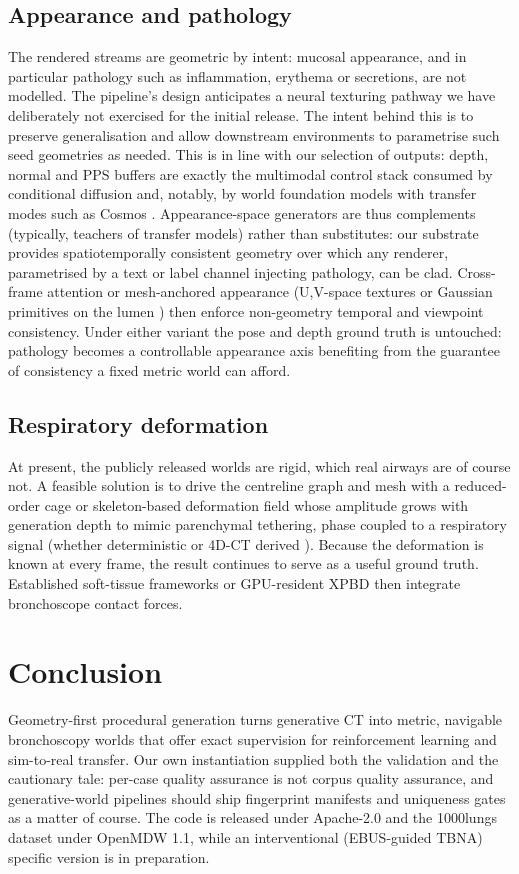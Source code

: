 \documentclass[conference]{IEEEtran}
\begin{document}
\subsection{Appearance and pathology}
\label{sec:appearance}
The rendered streams are geometric by intent: mucosal appearance, and in particular pathology such as inflammation, erythema or secretions, are not modelled. The pipeline's design anticipates a neural texturing pathway we have deliberately not exercised for the initial release. The intent behind this is to preserve generalisation and allow downstream environments to parametrise such seed geometries as needed. This is in line with our selection of outputs: depth, normal and PPS buffers are exactly the multimodal control stack consumed by conditional diffusion \cite{zhang2023controlnet} and, notably, by world foundation models with transfer modes such as Cosmos \cite{nvidia2025cosmos}. Appearance-space generators are thus complements (typically, teachers of transfer models) rather than substitutes: our substrate provides spatiotemporally consistent geometry over which any renderer, parametrised by a text or label channel injecting pathology, can be clad. Cross-frame attention or mesh-anchored appearance (U,V-space textures or Gaussian primitives on the lumen \cite{kerbl20233dgs}) then enforce non-geometry temporal and viewpoint consistency. Under either variant the pose and depth ground truth is untouched: pathology becomes a controllable appearance axis benefiting from the guarantee of consistency a fixed metric world can afford.

\subsection{Respiratory deformation}
At present, the publicly released worlds are rigid, which real airways are of course not. A feasible solution is to drive the centreline graph and mesh with a reduced-order cage or skeleton-based deformation field whose amplitude grows with generation depth to mimic parenchymal tethering, phase coupled to a respiratory signal (whether deterministic or 4D-CT derived \cite{keall2006respiratory}). Because the deformation is known at every frame, the result continues to serve as a useful ground truth. Established soft-tissue frameworks \cite{faure2012sofa} or GPU-resident XPBD then integrate bronchoscope contact forces.

\section{Conclusion}
Geometry-first procedural generation turns generative CT into metric, navigable bronchoscopy worlds that offer exact supervision for reinforcement learning and sim-to-real transfer. Our own instantiation supplied both the validation and the cautionary tale: per-case quality assurance is not corpus quality assurance, and generative-world pipelines should ship fingerprint manifests and uniqueness gates as a matter of course. The code is released under Apache-2.0 and the 1000lungs dataset under OpenMDW 1.1, while an interventional (EBUS-guided TBNA) specific version is in preparation.



\end{document}
